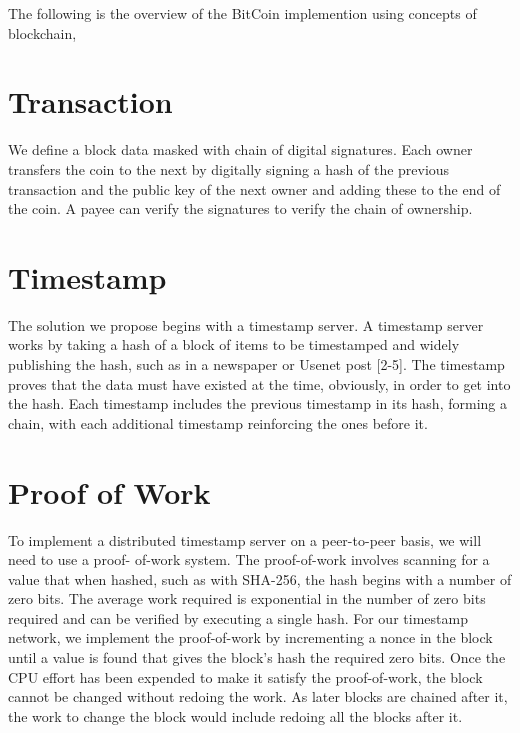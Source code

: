 \documentclass[a4paper,12pt]{report}
\begin{document}
The following is the overview of the BitCoin implemention using concepts of blockchain,

\section{Transaction}
We define a block data masked with chain of digital signatures. Each owner transfers the coin to the
next by digitally signing a hash of the previous transaction and the public key of the next owner
and adding these to the end of the coin. A payee can verify the signatures to verify the chain of
ownership.

\section{Timestamp}
The solution we propose begins with a timestamp server. A timestamp server works by taking a
hash of a block of items to be timestamped and widely publishing the hash, such as in a
newspaper or Usenet post [2-5]. The timestamp proves that the data must have existed at the
time, obviously, in order to get into the hash. Each timestamp includes the previous timestamp in
its hash, forming a chain, with each additional timestamp reinforcing the ones before it.

\section{Proof of Work}
To implement a distributed timestamp server on a peer-to-peer basis, we will need to use a proof-
of-work system. The proof-of-work involves scanning for a value that when hashed, such as with SHA-256, the
hash begins with a number of zero bits. The average work required is exponential in the number
of zero bits required and can be verified by executing a single hash.
For our timestamp network, we implement the proof-of-work by incrementing a nonce in the
block until a value is found that gives the block's hash the required zero bits. Once the CPU
effort has been expended to make it satisfy the proof-of-work, the block cannot be changed
without redoing the work. As later blocks are chained after it, the work to change the block
would include redoing all the blocks after it.
\end{document}
